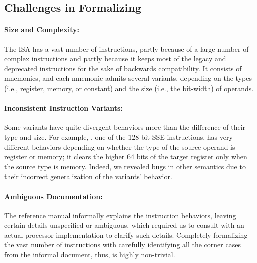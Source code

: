 \subsection{Challenges in Formalizing \ISA}


\paragraph{Size and Complexity:}
%
The \ISA ISA has a vast number of instructions, partly because of a large number of complex instructions and partly because it keeps most of the legacy and deprecated instructions for the sake of backwards compatibility.
It consists of \totalIntel{} mnemonics, and each mnemonic admits several variants, depending on the types (i.e., register, memory, or constant) and the size (i.e., the bit-width) of operands.

\paragraph{Inconsistent Instruction Variants:}
%
Some variants have quite divergent behaviors more than the difference of their type and size. For example, , one of the 128-bit SSE instructions, has very different behaviors depending on whether the type of the source operand is register or memory; it clears the higher 64 bits of the target register only when the source type is memory.
Indeed, we revealed bugs in other semantics due to their incorrect generalization of the variants' behavior.

\paragraph{Ambiguous Documentation:}
%
The \ISA reference manual informally explains the instruction behaviors, leaving certain details unspecified or ambiguous, which required us to consult with an actual processor implementation to clarify such details.
%
Completely formalizing the vast number of instructions with carefully identifying all the corner cases from the informal document, thus, is highly non-trivial.




